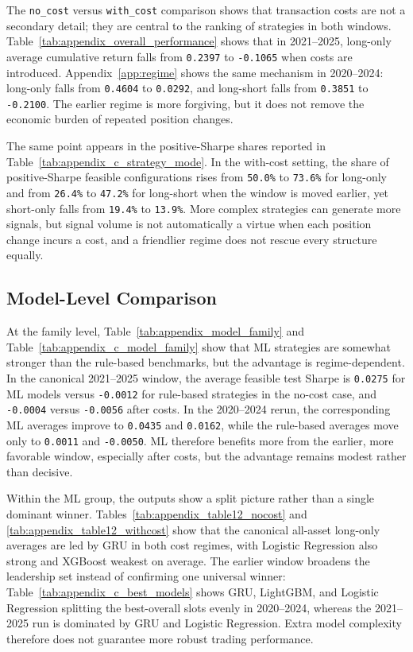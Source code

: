 \documentclass[12pt]{article}
\begin{document}
The \texttt{no\_cost} versus \texttt{with\_cost} comparison shows that transaction costs are not a secondary detail; they are central to the ranking of strategies in both windows. Table~\ref{tab:appendix_overall_performance} shows that in 2021--2025, long-only average cumulative return falls from \texttt{0.2397} to \texttt{-0.1065} when costs are introduced. Appendix~\ref{app:regime} shows the same mechanism in 2020--2024: long-only falls from \texttt{0.4604} to \texttt{0.0292}, and long-short falls from \texttt{0.3851} to \texttt{-0.2100}. The earlier regime is more forgiving, but it does not remove the economic burden of repeated position changes.

The same point appears in the positive-Sharpe shares reported in Table~\ref{tab:appendix_c_strategy_mode}. In the with-cost setting, the share of positive-Sharpe feasible configurations rises from \texttt{50.0\%} to \texttt{73.6\%} for long-only and from \texttt{26.4\%} to \texttt{47.2\%} for long-short when the window is moved earlier, yet short-only falls from \texttt{19.4\%} to \texttt{13.9\%}. More complex strategies can generate more signals, but signal volume is not automatically a virtue when each position change incurs a cost, and a friendlier regime does not rescue every structure equally.

\subsection{Model-Level Comparison}

At the family level, Table~\ref{tab:appendix_model_family} and Table~\ref{tab:appendix_c_model_family} show that ML strategies are somewhat stronger than the rule-based benchmarks, but the advantage is regime-dependent. In the canonical 2021--2025 window, the average feasible test Sharpe is \texttt{0.0275} for ML models versus \texttt{-0.0012} for rule-based strategies in the no-cost case, and \texttt{-0.0004} versus \texttt{-0.0056} after costs. In the 2020--2024 rerun, the corresponding ML averages improve to \texttt{0.0435} and \texttt{0.0162}, while the rule-based averages move only to \texttt{0.0011} and \texttt{-0.0050}. ML therefore benefits more from the earlier, more favorable window, especially after costs, but the advantage remains modest rather than decisive.

Within the ML group, the outputs show a split picture rather than a single dominant winner. Tables~\ref{tab:appendix_table12_nocost} and \ref{tab:appendix_table12_withcost} show that the canonical all-asset long-only averages are led by GRU in both cost regimes, with Logistic Regression also strong and XGBoost weakest on average. The earlier window broadens the leadership set instead of confirming one universal winner: Table~\ref{tab:appendix_c_best_models} shows GRU, LightGBM, and Logistic Regression splitting the best-overall slots evenly in 2020--2024, whereas the 2021--2025 run is dominated by GRU and Logistic Regression. Extra model complexity therefore does not guarantee more robust trading performance.
\end{document}
